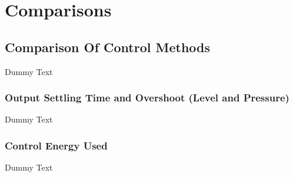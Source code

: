 \chapter{Comparisons}

\section{Comparison Of Control Methods}

Dummy Text

\subsection{Output Settling Time and Overshoot (Level and Pressure)}

Dummy Text

\subsection{Control Energy Used}

Dummy Text